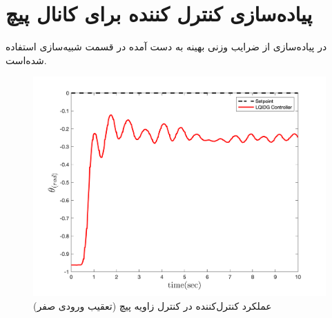\section{پیاده‌سازی کنترل کننده برای کانال پیچ}\label{roll_lqr_section}
در پیاده‌سازی از ضرایب وزنی بهینه به دست آمده در قسمت شبیه‌سازی استفاده شده‌است.
\begin{figure}[H]
	\includegraphics[width=.48\linewidth]{../Figures/Calibration/LQR/Pitch/lqr_pitch.png}
	\centering
	\caption{عملكرد کنترل‌کننده  در کنترل زاويه پیچ (تعقیب ورودی صفر)}
\end{figure}
%
